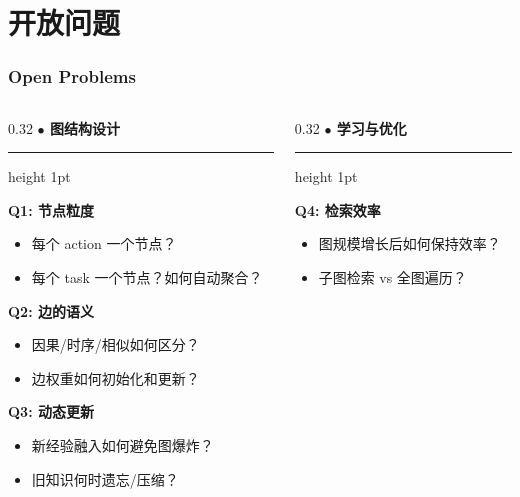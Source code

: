 \documentclass[aspectratio=169,10pt]{beamer}
\renewcommand{\footnotesize}{\tiny}
\begin{document}
\section{开放问题}

\begin{frame}
  \frametitle{Open Problems}

  \begin{columns}[t]
    \begin{column}{0.32\textwidth}
      \textbf{\textcolor{dotred}{\large $\bullet$} 图结构设计}
      \vspace{0.1cm}
      \hrule height 1pt
      \vspace{0.2cm}

      \textbf{Q1: 节点粒度}
      \begin{itemize}
        \item 每个 action 一个节点？
        \item 每个 task 一个节点？如何自动聚合？
      \end{itemize}

      \vspace{0.15cm}

      \textbf{Q2: 边的语义}
      \begin{itemize}
        \item 因果/时序/相似如何区分？
        \item 边权重如何初始化和更新？
      \end{itemize}

      \vspace{0.15cm}

      \textbf{Q3: 动态更新}
      \begin{itemize}
        \item 新经验融入如何避免图爆炸？
        \item 旧知识何时遗忘/压缩？
      \end{itemize}
    \end{column}

    \begin{column}{0.32\textwidth}
      \textbf{\textcolor{dotyellow}{\large $\bullet$} 学习与优化}
      \vspace{0.1cm}
      \hrule height 1pt
      \vspace{0.2cm}

      \textbf{Q4: 检索效率}
      \begin{itemize}
        \item 图规模增长后如何保持效率？
        \item 子图检索 vs 全图遍历？
      \end{itemize}


\end{column}
\end{columns}
\end{frame}
\end{document}
